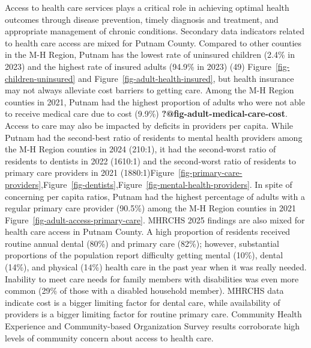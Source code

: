 \documentclass[
  english,
  letterpaper,
]{report}
\begin{document}
Access to health care services plays a critical role in achieving
optimal health outcomes through disease prevention, timely diagnosis and
treatment, and appropriate management of chronic conditions. Secondary
data indicators related to health care access are mixed for Putnam
County. Compared to other counties in the M-H Region, Putnam has the
lowest rate of uninsured children (2.4\% in 2023) and the highest rate
of insured adults (94.9\% in 2023) (49)
Figure~\ref{fig-children-uninsured} and
Figure~\ref{fig-adult-health-insured}, but health insurance may not
always alleviate cost barriers to getting care. Among the M-H Region
counties in 2021, Putnam had the highest proportion of adults who were
not able to receive medical care due to cost (9.9\%)
\textbf{?@fig-adult-medical-care-cost}. Access to care may also be
impacted by deficits in providers per capita. While Putnam had the
second-best ratio of residents to mental health providers among the M-H
Region counties in 2024 (210:1), it had the second-worst ratio of
residents to dentists in 2022 (1610:1) and the second-worst ratio of
residents to primary care providers in 2021
(1880:1)Figure~\ref{fig-primary-care-providers},Figure~\ref{fig-dentists},Figure~\ref{fig-mental-health-providers}.
In spite of concerning per capita ratios, Putnam had the highest
percentage of adults with a regular primary care provider (90.5\%) among
the M-H Region counties in 2021
Figure~\ref{fig-adult-access-primary-care}. MHRCHS 2025 findings are
also mixed for health care access in Putnam County. A high proportion of
residents received routine annual dental (80\%) and primary care (82\%);
however, substantial proportions of the population report difficulty
getting mental (10\%), dental (14\%), and physical (14\%) health care in
the past year when it was really needed. Inability to meet care needs
for family members with disabilities was even more common (29\% of those
with a disabled household member). MHRCHS data indicate cost is a bigger
limiting factor for dental care, while availability of providers is a
bigger limiting factor for routine primary care. Community Health
Experience and Community-based Organization Survey results corroborate
high levels of community concern about access to health care.
\end{document}
